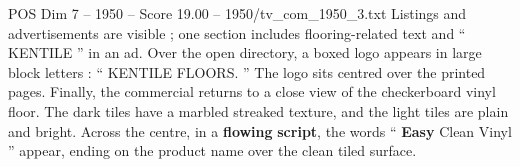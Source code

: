 \begin{textsample}{POS Dim 7 – 1950 – Score 19.00 – 1950/tv\_com\_1950\_3.txt}
Listings and advertisements are visible ; one section includes flooring-related text and “ KENTILE ” in an ad.
Over the open directory, a boxed logo appears in large block letters : “ KENTILE FLOORS. ” The logo sits centred over the printed pages.
Finally, the commercial returns to a close view of the checkerboard vinyl floor.
The dark tiles have a marbled streaked texture, and the light tiles are plain and bright.
Across the centre, in a \textbf{flowing} \textbf{script}, the words “ \textbf{Easy} Clean Vinyl ” appear, ending on the product name over the clean tiled surface.

\end{textsample}
